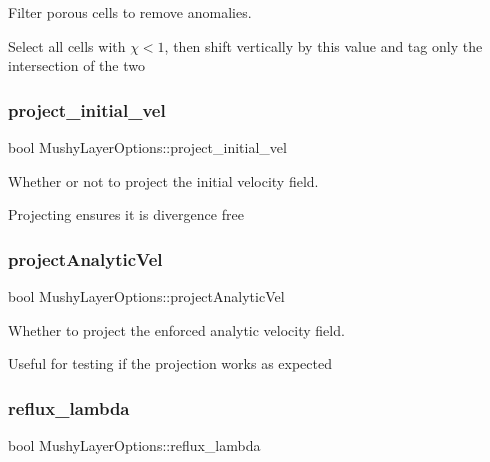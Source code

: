 Filter porous cells to remove anomalies. 

Select all cells with $\chi < 1$, then shift vertically by this value and tag only the intersection of the two \mbox{\label{struct_mushy_layer_options_a0bd978ad44ee7dff6ca8d00c9092a18b}} 
\subsubsection{\texorpdfstring{project\+\_\+initial\+\_\+vel}{project\_initial\_vel}}
{\footnotesize\ttfamily bool Mushy\+Layer\+Options\+::project\+\_\+initial\+\_\+vel}



Whether or not to project the initial velocity field. 

Projecting ensures it is divergence free \mbox{\label{struct_mushy_layer_options_ad55453d9ed5cc38c3bfb6be643d8e240}} 
\subsubsection{\texorpdfstring{project\+Analytic\+Vel}{projectAnalyticVel}}
{\footnotesize\ttfamily bool Mushy\+Layer\+Options\+::project\+Analytic\+Vel}



Whether to project the enforced analytic velocity field. 

Useful for testing if the projection works as expected \mbox{\label{struct_mushy_layer_options_a7fcaaba35b9ec20a078c88bf199f4247}} 
\subsubsection{\texorpdfstring{reflux\+\_\+lambda}{reflux\_lambda}}
{\footnotesize\ttfamily bool Mushy\+Layer\+Options\+::reflux\+\_\+lambda}



